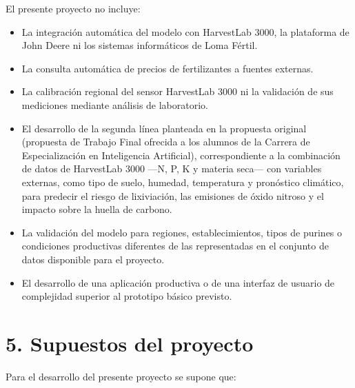 \documentclass[
11pt, %
]{charter}
\begin{document}
El presente proyecto no incluye:

\begin{itemize}
\item La integración automática del modelo con HarvestLab 3000, la plataforma de John Deere ni los sistemas informáticos de Loma Fértil.
\item La consulta automática de precios de fertilizantes a fuentes externas.
\item La calibración regional del sensor HarvestLab 3000 ni la validación de sus mediciones mediante análisis de laboratorio.
\item El desarrollo de la segunda línea planteada en la propuesta original (propuesta de Trabajo Final ofrecida a los alumnos de la Carrera de Especialización en Inteligencia Artificial), correspondiente a la combinación de datos de HarvestLab 3000 —N, P, K y materia seca— con variables externas, como tipo de suelo, humedad, temperatura y pronóstico climático, para predecir el riesgo de lixiviación, las emisiones de óxido nitroso y el impacto sobre la huella de carbono.
\item La validación del modelo para regiones, establecimientos, tipos de purines o condiciones productivas diferentes de las representadas en el conjunto de datos disponible para el proyecto.
\item El desarrollo de una aplicación productiva o de una interfaz de usuario de complejidad superior al prototipo básico previsto.
\end{itemize}





\section{5. Supuestos del proyecto}
\label{sec:supuestos}

Para el desarrollo del presente proyecto se supone que:
\end{document}
